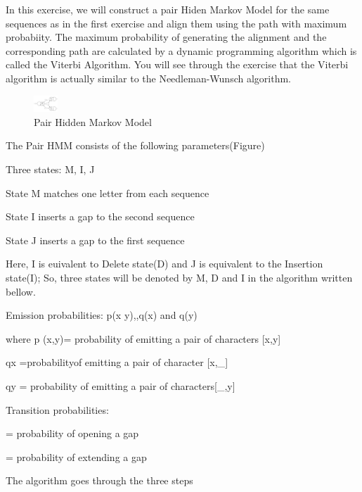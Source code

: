 \documentclass[a4paper,11pt]{article}
\DeclareRobustCommand{\greektext}{%
  \fontencoding{LGR}\selectfont\def\encodingdefault{LGR}}
\DeclareRobustCommand{\textgreek}[1]{\leavevmode{\greektext #1}}
\begin{document}
In this exercise, we will construct a pair Hiden Markov Model for
the same sequences as in the first exercise and align them using the
path with maximum probabiity. The maximum probability of generating
the alignment and the corresponding path are calculated by a dynamic
programming algorithm which is called the Viterbi Algorithm. You will
see through the exercise that the Viterbi algorithm is actually similar
to the Needleman-Wunsch algorithm.

%
\begin{figure}[h]
\begin{center}
\includegraphics[width=0.08\textwidth]{HMM.jpg}\caption{Pair Hidden Markov Model}

\end{center}

%
\end{figure}


The Pair HMM consists of the following parameters(Figure)

\vspace{0.5cm}

Three states: M, I, J

State M matches one letter from each sequence

State I inserts a gap to the second sequence

State J inserts a gap to the first sequence 


Here, I is euivalent to Delete state(D) and J is equivalent to the Insertion state(I);
So, three states will be denoted by M, D and I in the algorithm written bellow.
\vspace{0.5cm}

Emission probabilities: p(x y),,q(x) and q(y)

where p (x,y)= probability of emitting a pair of characters {[}x,y{]}

qx =probabilityof emitting a pair of character {[}x,\_{]}

qy = probability of emitting a pair of characters{[}\_,y{]}

\vspace{0.5cm}

Transition probabilities:

\textgreek{d} = probability of opening a gap

\textgreek{e} = probability of extending a gap

The algorithm goes through the three steps
\end{document}
